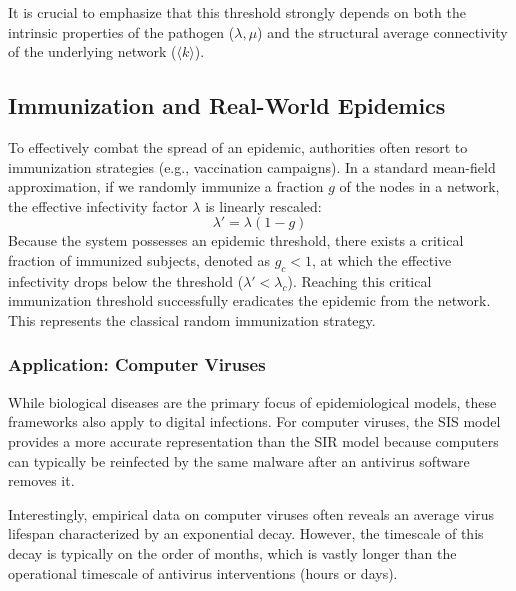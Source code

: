 
It is crucial to emphasize that this threshold strongly depends on both the intrinsic properties of the pathogen (\(\lambda, \mu\)) and the structural average connectivity of the underlying network (\(\langle k \rangle\)).

\subsection{Immunization and Real-World Epidemics}
\label{subsec:immunization_real_world}

To effectively combat the spread of an epidemic, authorities often resort to immunization strategies (e.g., vaccination campaigns). In a standard mean-field approximation, if we randomly immunize a fraction \(g\) of the nodes in a network, the effective infectivity factor \(\lambda\) is linearly rescaled:
\[
    \lambda' = \lambda(1 - g)
\]
Because the system possesses an epidemic threshold, there exists a critical fraction of immunized subjects, denoted as \(g_c < 1\), at which the effective infectivity drops below the threshold (\(\lambda' < \lambda_c\)). Reaching this critical immunization threshold successfully eradicates the epidemic from the network. This represents the classical random immunization strategy.

\subsubsection{Application: Computer Viruses}

While biological diseases are the primary focus of epidemiological models, these frameworks also apply to digital infections. For computer viruses, the SIS model provides a more accurate representation than the SIR model because computers can typically be reinfected by the same malware after an antivirus software removes it.

Interestingly, empirical data on computer viruses often reveals an average virus lifespan characterized by an exponential decay. However, the timescale of this decay is typically on the order of months, which is vastly longer than the operational timescale of antivirus interventions (hours or days).


